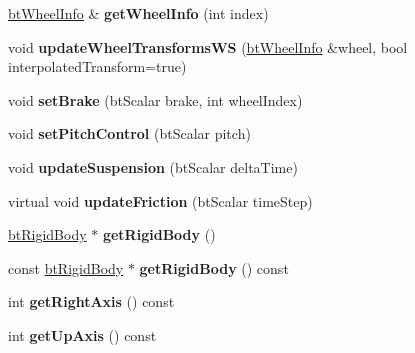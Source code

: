 \begin{DoxyCompactItemize}
\item 
\mbox{\label{classbtRaycastVehicle_ac3159550063d7dabd3c796735a77c2f4}} 
\hyperlink{structbtWheelInfo}{bt\+Wheel\+Info} \& {\bfseries get\+Wheel\+Info} (int index)
\item 
\mbox{\label{classbtRaycastVehicle_a097dff14b09869992c4c2ced984305b3}} 
void {\bfseries update\+Wheel\+Transforms\+WS} (\hyperlink{structbtWheelInfo}{bt\+Wheel\+Info} \&wheel, bool interpolated\+Transform=true)
\item 
\mbox{\label{classbtRaycastVehicle_a6b9dd519ac59a2bf326f4ff423e4ba6d}} 
void {\bfseries set\+Brake} (bt\+Scalar brake, int wheel\+Index)
\item 
\mbox{\label{classbtRaycastVehicle_ab37ab7f7f32f8d62222061fd114aa822}} 
void {\bfseries set\+Pitch\+Control} (bt\+Scalar pitch)
\item 
\mbox{\label{classbtRaycastVehicle_a6be582b77af41d8ad50369d30882776d}} 
void {\bfseries update\+Suspension} (bt\+Scalar delta\+Time)
\item 
\mbox{\label{classbtRaycastVehicle_a170d5dac1f150f63b837f5782a28b3fc}} 
virtual void {\bfseries update\+Friction} (bt\+Scalar time\+Step)
\item 
\mbox{\label{classbtRaycastVehicle_af240c382a71932a3efd9a3d88895375c}} 
\hyperlink{classbtRigidBody}{bt\+Rigid\+Body} $\ast$ {\bfseries get\+Rigid\+Body} ()
\item 
\mbox{\label{classbtRaycastVehicle_a780e7abcff029bee48bf888327b0a856}} 
const \hyperlink{classbtRigidBody}{bt\+Rigid\+Body} $\ast$ {\bfseries get\+Rigid\+Body} () const
\item 
\mbox{\label{classbtRaycastVehicle_a8900579eb259c892f9866564560494e6}} 
int {\bfseries get\+Right\+Axis} () const
\item 
\mbox{\label{classbtRaycastVehicle_a2b25853702eca35f0abbd66275864547}} 
int {\bfseries get\+Up\+Axis} () const

\end{DoxyCompactItemize}
